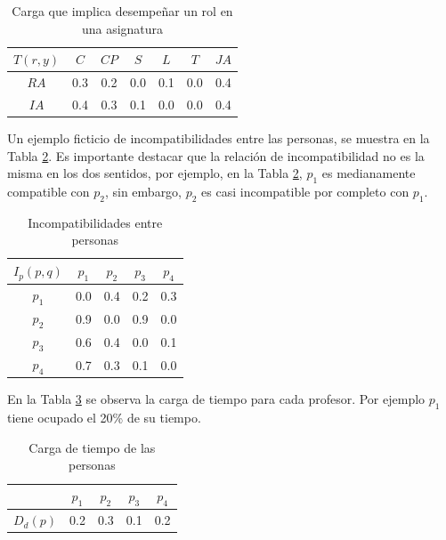 \begin{table}[H]
	\centering
	\caption{Carga que implica desempeñar un rol en una asignatura}\label{tr-carga}
	\begin{tabular}{|c|c|c|c|c|c|c|}
		\hline
		$T(r,y)$ & $C$ & $CP$ & $S$ & $L$ & $T$ & $JA$   \\ \hline
		$RA$    & 0.3 &  0.2 & 0.0 & 0.1 & 0.0  & 0.4  \\ \hline
		$IA$     & 0.4 &  0.3 & 0.1 & 0.0 & 0.0  & 0.4  \\ \hline
	\end{tabular}
\end{table}

Un ejemplo ficticio de incompatibilidades entre las personas, se muestra en la Tabla \ref{iep-carga}. Es importante destacar que la relación de incompatibilidad no es la misma en los dos sentidos, por ejemplo, en la Tabla \ref{iep-carga}, $ p_1 $ es medianamente compatible con $ p_2 $, sin embargo, $ p_2 $ es casi incompatible por completo con $ p_1 $. 

\begin{table}[H]
	\centering
	\caption{Incompatibilidades entre personas}\label{iep-carga}
	\begin{tabular}{|c|c|c|c|c|}
		\hline
		$I_p(p,q)$ & $p_1$& $p_2$& $p_3$& $p_4$ \\ \hline
		$p_1$  	   & 0.0  &  0.4 & 0.2  &  0.3 \\ \hline
		$p_2$ 	   & 0.9  &  0.0 & 0.9  &  0.0 \\ \hline
		$p_3$      & 0.6  &  0.4 & 0.0  &  0.1 \\ \hline
		$p_4$ 	   & 0.7  &  0.3 & 0.1  &  0.0 \\ \hline
	\end{tabular}
\end{table}

En la Tabla \ref{tp-carga} se observa la carga de tiempo para cada profesor. Por ejemplo $ p_1 $ tiene ocupado el 20\% de su tiempo.

\begin{table}[H]
	\centering
	\caption{Carga de tiempo de las personas}\label{tp-carga}
	\begin{tabular}{|c|c|c|c|c|}
		\cline{2-5}
		\multicolumn{1}{c|}{}& $p_1$ & $p_2$ & $p_3$  & $p_4$ \\ \hline
		$D_d(p)$    & 0.2 & 0.3 & 0.1 & 0.2 \\ \hline
	\end{tabular}
\end{table}

